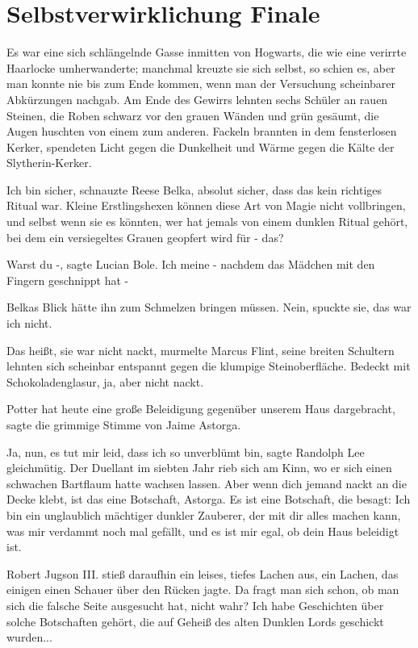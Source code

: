 \chapter{Selbstverwirklichung Finale}

Es war eine sich schlängelnde Gasse inmitten von Hogwarts, die wie eine verirrte
Haarlocke umherwanderte; manchmal kreuzte sie sich selbst, so schien es, aber
man konnte nie bis zum Ende kommen, wenn man der Versuchung scheinbarer
Abkürzungen nachgab. Am Ende des Gewirrs lehnten sechs Schüler an rauen Steinen,
die Roben schwarz vor den grauen Wänden und grün gesäumt, die Augen huschten von
einem zum anderen. Fackeln brannten in dem fensterlosen Kerker, spendeten Licht
gegen die Dunkelheit und Wärme gegen die Kälte der Slytherin-Kerker.

\glqq{}Ich bin sicher\grqq{}, schnauzte Reese Belka, \glqq{}absolut sicher, dass
das kein richtiges Ritual war. Kleine Erstlingshexen können diese Art von Magie
nicht vollbringen, und selbst wenn sie es könnten, wer hat jemals von einem
dunklen Ritual gehört, bei dem ein versiegeltes Grauen geopfert wird für -
das?\grqq{}

\glqq{}Warst du -\grqq{}, sagte Lucian Bole. \glqq{}Ich meine - nachdem das
Mädchen mit den Fingern geschnippt hat -\grqq{}

Belkas Blick hätte ihn zum Schmelzen bringen müssen. \glqq{}Nein\grqq{}, spuckte
sie, \glqq{}das war ich nicht.\grqq{}

\glqq{}Das heißt, sie war nicht nackt\grqq{}, murmelte Marcus Flint, seine
breiten Schultern lehnten sich scheinbar entspannt gegen die klumpige
Steinoberfläche. \glqq{}Bedeckt mit Schokoladenglasur, ja, aber nicht
nackt.\grqq{}

\glqq{}Potter hat heute eine große Beleidigung gegenüber unserem Haus
dargebracht\grqq{}, sagte die grimmige Stimme von Jaime Astorga.

\glqq{}Ja, nun, es tut mir leid, dass ich so unverblümt bin\grqq{}, sagte
Randolph Lee gleichmütig. Der Duellant im siebten Jahr rieb sich am Kinn, wo er
sich einen schwachen Bartflaum hatte wachsen lassen. \glqq{}Aber wenn dich jemand
nackt an die Decke klebt, ist das eine Botschaft, Astorga. Es ist eine
Botschaft, die besagt: Ich bin ein unglaublich mächtiger dunkler Zauberer, der
mit dir alles machen kann, was mir verdammt noch mal gefällt, und es ist mir
egal, ob dein Haus beleidigt ist.\grqq{}

Robert Jugson III. stieß daraufhin ein leises, tiefes Lachen aus, ein Lachen,
das einigen einen Schauer über den Rücken jagte. \glqq{}Da fragt man sich schon,
ob man sich die falsche Seite ausgesucht hat, nicht wahr? Ich habe Geschichten
über solche Botschaften gehört, die auf Geheiß des alten Dunklen Lords geschickt
wurden...\grqq{}

